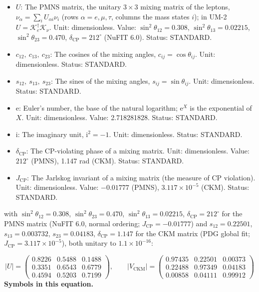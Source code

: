 \documentclass[
  10pt,
]{article}
\providecommand{\tightlist}{%
  \setlength{\itemsep}{0pt}\setlength{\parskip}{0pt}}
\begin{document}
\begin{itemize}
\tightlist
\item
  \(U\): The PMNS matrix, the unitary \(3 \times 3\) mixing matrix of
  the leptons, \(\nu_\alpha = \sum_iU_{\alpha i}\nu_i\) (rows
  \(\alpha = e, \mu, \tau\), columns the mass states \(i\)); in UM-2
  \(U = \mathcal{K}_e^\dagger\mathcal{K}_\nu\). Unit: dimensionless.
  Value: \(\sin^2\theta_{12} = 0.308\), \(\sin^2\theta_{13} = 0.02215\),
  \(\sin^2\theta_{23} = 0.470\), \(\delta_{\mathrm{CP}} = 212^\circ\)
  (NuFIT 6.0). Status: STANDARD.
\item
  \(c_{12},\ c_{13},\ c_{23}\): The cosines of the mixing angles,
  \(c_{ij} = \cos\theta_{ij}\). Unit: dimensionless. Status: STANDARD.
\item
  \(s_{12},\ s_{13},\ s_{23}\): The sines of the mixing angles,
  \(s_{ij} = \sin\theta_{ij}\). Unit: dimensionless. Status: STANDARD.
\item
  \(\mathrm{e}\): Euler's number, the base of the natural logarithm;
  \(\mathrm{e}^{X}\) is the exponential of \(X\). Unit: dimensionless.
  Value: 2.718281828. Status: STANDARD.
\item
  \(\mathrm{i}\): The imaginary unit, \(\mathrm{i}^2 = -1\). Unit:
  dimensionless. Status: STANDARD.
\item
  \(\delta_{\mathrm{CP}}\): The CP-violating phase of a mixing matrix.
  Unit: dimensionless. Value: \(212^\circ\) (PMNS), 1.147 rad (CKM).
  Status: STANDARD.
\item
  \(J_{\mathrm{CP}}\): The Jarlskog invariant of a mixing matrix (the
  measure of CP violation). Unit: dimensionless. Value: \(-0.01777\)
  (PMNS), \(3.117\times10^{-5}\) (CKM). Status: STANDARD.
\end{itemize}

with \(\sin^2\theta_{12} = 0.308\), \(\sin^2\theta_{23} = 0.470\),
\(\sin^2\theta_{13} = 0.02215\), \(\delta_{\mathrm{CP}} = 212^\circ\)
for the PMNS matrix (NuFIT 6.0, normal ordering;
\(J_{\mathrm{CP}} = -0.01777\)) and \(s_{12} = 0.22501\),
\(s_{13} = 0.003732\), \(s_{23} = 0.04183\),
\(\delta_{\mathrm{CP}} = 1.147\) for the CKM matrix (PDG global fit;
\(J_{\mathrm{CP}} = 3.117\times10^{-5}\)), both unitary to
\(1.1\times10^{-16}\):

\[ \lvert U\rvert = \begin{pmatrix} 0.8226 & 0.5488 & 0.1488\\ 0.3351 & 0.6543 & 0.6779\\ 0.4594 & 0.5203 & 0.7199\end{pmatrix},\qquad \lvert V_{\mathrm{CKM}}\rvert = \begin{pmatrix} 0.97435 & 0.22501 & 0.00373\\ 0.22488 & 0.97349 & 0.04183\\ 0.00858 & 0.04111 & 0.99912\end{pmatrix} \]
\textbf{Symbols in this equation.}
\end{document}

